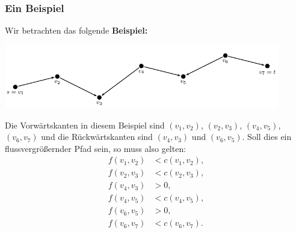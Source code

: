\documentclass[smaller]{beamer}
\begin{document}
\begin{frame}
 \frametitle{Ein Beispiel}
 Wir betrachten das folgende \textbf{Beispiel:}
 \begin{center}
  \includegraphics[width=0.9\textwidth]{fig18.pdf}
 \end{center}
 Die Vorwärtskanten in diesem Beispiel sind $(v_1,v_2)$, $(v_2,v_3)$, $(v_4,v_5)$, $(v_6,v_7)$ und die Rückwärtskanten sind $(v_4,v_3)$ und $(v_6,v_5)$. Soll dies ein flussvergrößernder Pfad sein, so muss also gelten:
\begin{align*}
f(v_1,v_2) &< c(v_1,v_2), \\
f(v_2,v_3) &< c(v_2,v_3), \\
f(v_4,v_3) &> 0, \\
f(v_4,v_5) &< c(v_4,v_5), \\
f(v_6,v_5) &> 0, \\
f(v_6,v_7) &< c(v_6,v_7).
\end{align*}
\end{frame}
\end{document}
